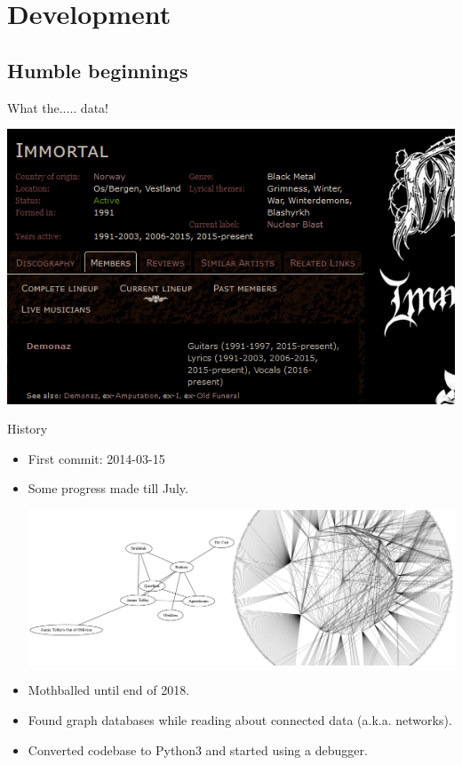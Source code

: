 \documentclass{beamer}
\begin{document}
\section{Development}

  \subsection{Humble beginnings}

    \begin{frame}{What the..... data!}
    
      \begin{center}
        \includegraphics[scale=2]{MA_Immortal}
      \end{center}
    
    \end{frame}

    \begin{frame}{History}

      \begin{itemize}

        \item<1-> First commit: 2014-03-15
        \item<1-> Some progress made till July.
          \begin{center}
            \includegraphics[scale=.6]{bandsGraphCombined}
          \end{center}
        \item<2-> Mothballed until end of 2018.
        \item<2-> Found graph databases while reading about connected data
          (a.k.a. networks).
        \item<2-> Converted codebase to Python3 and started using a debugger.
      \end{itemize}

    \end{frame}
    
\end{document}
